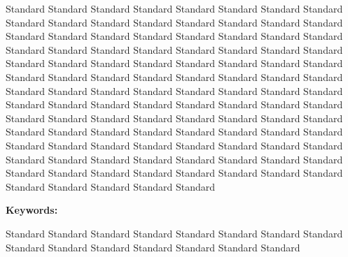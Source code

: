 \begin{framed}
\noindent
\normalsize
Standard Standard Standard Standard Standard Standard Standard Standard Standard Standard Standard Standard Standard Standard Standard Standard Standard Standard Standard Standard Standard Standard Standard Standard Standard Standard Standard Standard Standard Standard Standard Standard Standard Standard Standard Standard Standard Standard Standard Standard Standard Standard Standard Standard Standard Standard Standard Standard Standard Standard Standard Standard Standard Standard Standard Standard Standard Standard Standard Standard Standard Standard Standard Standard Standard Standard Standard Standard Standard Standard Standard Standard Standard Standard Standard Standard Standard Standard Standard Standard Standard Standard Standard Standard Standard Standard Standard Standard Standard Standard Standard Standard Standard Standard Standard Standard Standard Standard Standard Standard Standard Standard Standard Standard Standard Standard Standard Standard Standard 
\end{framed}
 
\vspace{16pt}
\noindent\huge\textbf{Keywords:}
\begin{framed}
\normalsize
\noindent
    Standard Standard Standard Standard Standard Standard Standard Standard Standard Standard Standard Standard Standard Standard Standard
\end{framed}